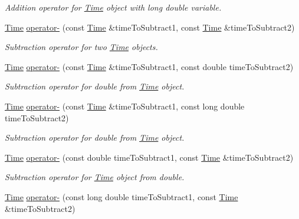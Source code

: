 \begin{DoxyCompactItemize}
\begin{DoxyCompactList}\small\item\em Addition operator for \hyperlink{classtudat_1_1Time}{Time} object with long double variable. \end{DoxyCompactList}\item 
\hyperlink{classtudat_1_1Time}{Time} \hyperlink{classtudat_1_1Time_a6d55218ba360b4c12999556f0cf6b35f}{operator-\/} (const \hyperlink{classtudat_1_1Time}{Time} \&time\+To\+Subtract1, const \hyperlink{classtudat_1_1Time}{Time} \&time\+To\+Subtract2)
\begin{DoxyCompactList}\small\item\em Subtraction operator for two \hyperlink{classtudat_1_1Time}{Time} objects. \end{DoxyCompactList}\item 
\hyperlink{classtudat_1_1Time}{Time} \hyperlink{classtudat_1_1Time_a5148c9476a8aab1414684dea76346bff}{operator-\/} (const \hyperlink{classtudat_1_1Time}{Time} \&time\+To\+Subtract1, const double time\+To\+Subtract2)
\begin{DoxyCompactList}\small\item\em Subtraction operator for double from \hyperlink{classtudat_1_1Time}{Time} object. \end{DoxyCompactList}\item 
\hyperlink{classtudat_1_1Time}{Time} \hyperlink{classtudat_1_1Time_a9f010abad33c1056d320912f89f7cd48}{operator-\/} (const \hyperlink{classtudat_1_1Time}{Time} \&time\+To\+Subtract1, const long double time\+To\+Subtract2)
\begin{DoxyCompactList}\small\item\em Subtraction operator for double from \hyperlink{classtudat_1_1Time}{Time} object. \end{DoxyCompactList}\item 
\hyperlink{classtudat_1_1Time}{Time} \hyperlink{classtudat_1_1Time_a6ea346d4961ca625df91e4fd81eb9568}{operator-\/} (const double time\+To\+Subtract1, const \hyperlink{classtudat_1_1Time}{Time} \&time\+To\+Subtract2)
\begin{DoxyCompactList}\small\item\em Subtraction operator for \hyperlink{classtudat_1_1Time}{Time} object from double. \end{DoxyCompactList}\item 
\hyperlink{classtudat_1_1Time}{Time} \hyperlink{classtudat_1_1Time_ae440cbdce69be6fea0f5f19ffe2a1f13}{operator-\/} (const long double time\+To\+Subtract1, const \hyperlink{classtudat_1_1Time}{Time} \&time\+To\+Subtract2)

\end{DoxyCompactItemize}

